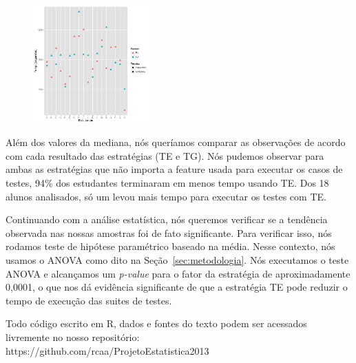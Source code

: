\begin{figure}[t]
    \centering
    \includegraphics[width=0.4\textwidth]{images/dotplot.png}
    \caption{}
    \label{fig:dotplot}
\end{figure}

Além dos valores da mediana, nós queríamos comparar as observações de acordo com cada resultado das estratégias (TE e TG). Nós pudemos observar para ambas as estratégias que não importa a feature usada para executar os casos de testes, 94\% dos estudantes terminaram em menos tempo usando TE. Dos 18 alunos analisados, só um levou mais tempo para executar os testes com TE.

Continuando com a análise estatística, nós queremos verificar se a tendência observada nas nossas amostras foi de fato significante. Para verificar isso, nós rodamos teste de hipótese paramétrico baseado na média. Nesse contexto, nós usamos o ANOVA como dito na Seção~\ref{sec:metodologia}. Nós executamos o teste ANOVA e alcançamos um \emph{p-value} para o fator da estratégia de aproximadamente 0,0001, o que nos dá evidência significante de que a estratégia TE pode reduzir o tempo de execução das suites de testes.

Todo código escrito em R, dados e fontes do texto podem ser acessados livremente no nosso repositório: \\https://github.com/rcaa/ProjetoEstatistica2013